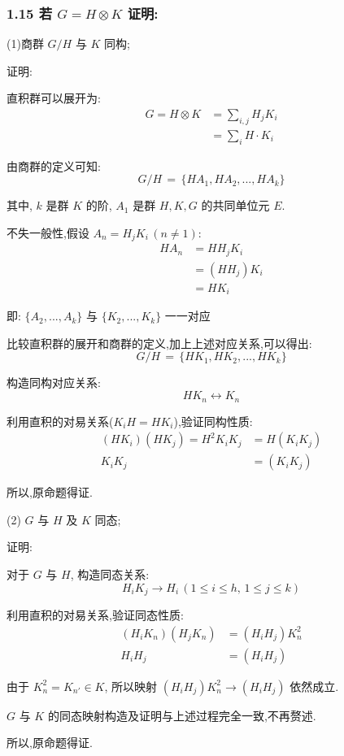     \subsubsection{1.15 \textnormal{若 $G = H \otimes K$ 证明:}}
    \noindent (1)商群 $ G / H $ 与 $ K $ 同构;

    {\color{hwSolution}
    \noindent 证明:
        
        直积群可以展开为:
        \begin{align*}
            G = H \otimes K
                &= \sum\limits_{i,j}^{} H_j K_i\\
                &= \sum\limits_{i}^{} H\cdot K_i
        \end{align*}

        由商群的定义可知:
        \[ G/H\,=\,\{HA_1,HA_2,...,HA_k\} \]

        其中, $k$ 是群 $K$ 的阶, $A_1$ 是群 $H,K,G$ 的共同单位元 $E$.

        不失一般性,假设 $A_n = H_j K_i\,(n\neq 1)$:
        \begin{align*}
            H A_n
                &= H H_j K_i \\
                &= (H H_j) K_i \\
                &= H K_i
        \end{align*}

        即:  $\{A_2,...,A_k\}$ 与 $\{K_2,...,K_k\}$ 一一对应

        比较直积群的展开和商群的定义,加上上述对应关系,可以得出:
        \[ G/H\,=\,\{HK_1,HK_2,...,HK_k\} \]
        
        构造同构对应关系:
        \[ HK_n \leftrightarrow K_n \]

        利用直积的对易关系($K_i H = H K_i$),验证同构性质:
        \begin{align*}
            (H K_i) (H K_j) = H^2 K_i K_j &= H (K_i K_j) \\
            K_i K_j &= (K_i K_j) 
        \end{align*}

        所以,原命题得证.
    }

    \noindent (2) $ G $ 与 $ H $ 及 $ K $ 同态;

    {\color{hwSolution}
    \noindent 证明:
        
        对于 $G$ 与 $H$, 构造同态关系:
        \[ H_i K_j \rightarrow H_i\,(1\leq i\leq h,\,1\leq j\leq k)\]

        利用直积的对易关系,验证同态性质:
        \begin{align*}
            (H_i K_n) (H_j K_n) &= (H_i H_j) K_n^2 \\
            H_i H_j &= (H_i H_j)
        \end{align*}

        由于 $K_n^2 = K_{n'} \in K$, 所以映射 $(H_i H_j) K_n^2 \rightarrow (H_i H_j)$ 依然成立.

        $G$ 与 $K$ 的同态映射构造及证明与上述过程完全一致,不再赘述.

        所以,原命题得证.
    }

